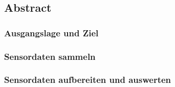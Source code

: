 
\subsection*{Abstract}

\subsubsection*{Ausgangslage und Ziel}


\subsubsection*{Sensordaten sammeln}


\subsubsection*{Sensordaten aufbereiten und auswerten}

